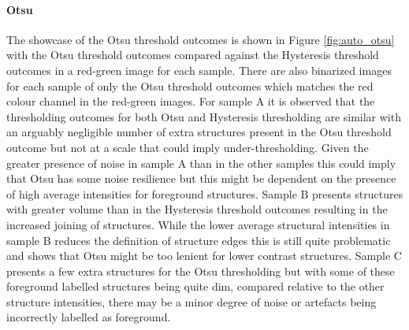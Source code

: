 \paragraph{Otsu} The showcase of the Otsu threshold outcomes is shown in Figure \ref{fig:auto_otsu} with the Otsu threshold outcomes compared against the Hysteresis threshold outcomes in a red-green image for each sample. There are also binarized images for each sample of only the Otsu threshold outcomes which matches the red colour channel in the red-green images.
For sample A it is observed that the thresholding outcomes for both Otsu and Hysteresis thresholding are similar with an arguably negligible number of extra structures present in the Otsu threshold outcome but not at a scale that could imply under-thresholding. Given the greater presence of noise in sample A than in the other samples this could imply that Otsu has some noise resilience but this might be dependent on the presence of high average intensities for foreground structures. Sample B presents structures with greater volume than in the Hysteresis threshold outcomes resulting in the increased joining of structures. While the lower average structural intensities in sample B reduces the definition of structure edges this is still quite problematic and shows that Otsu might be too lenient for lower contrast structures. Sample C presents a few extra structures for the Otsu thresholding but with some of these foreground labelled structures being quite dim, compared relative to the other structure intensities, there may be a minor degree of noise or artefacts being incorrectly labelled as foreground.
